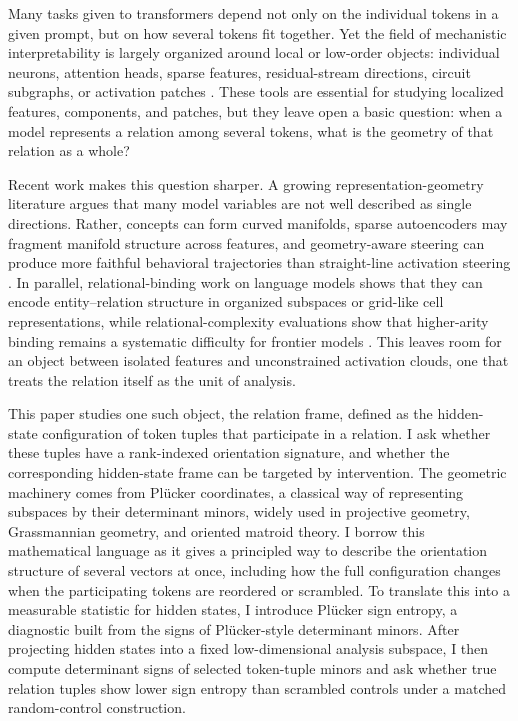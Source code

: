 \documentclass[11pt]{article}
\begin{document}
Many tasks given to transformers depend not only on the individual tokens in a given prompt, but on how several tokens fit together. Yet the field of mechanistic interpretability is largely organized around local or low-order objects: individual neurons, attention heads, sparse features, residual-stream directions, circuit subgraphs, or activation patches \citep{elhage2021framework,bricken2023monosemanticity,cunningham2024sparse,wang2023interpretability,conmy2023acdc}. These tools are essential for studying localized features, components, and patches, but they leave open a basic question: when a model represents a relation among several tokens, what is the geometry of that relation as a whole?

Recent work makes this question sharper. A growing representation-geometry literature argues that many model variables are not well described as single directions. Rather, concepts can form curved manifolds, sparse autoencoders may fragment manifold structure across features, and geometry-aware steering can produce more faithful behavioral trajectories than straight-line activation steering \citep{bhalla2026saemanifolds,wurgaft2026manifoldsteering,sarfati2026beliefs,tiblias2026smds}. In parallel, relational-binding work on language models shows that they can encode entity--relation structure in organized subspaces or grid-like cell representations, while relational-complexity evaluations show that higher-arity binding remains a systematic difficulty for frontier models \citep{dai2026cellbinding,fesser2026rel}. This leaves room for an object between isolated features and unconstrained activation clouds, one that treats the relation itself as the unit of analysis.

This paper studies one such object, the relation frame, defined as the hidden-state configuration of token tuples that participate in a relation. I ask whether these tuples have a rank-indexed orientation signature, and whether the corresponding hidden-state frame can be targeted by intervention. The geometric machinery comes from Pl\"ucker coordinates, a classical way of representing subspaces by their determinant minors, widely used in projective geometry, Grassmannian geometry, and oriented matroid theory. I borrow this mathematical language as it gives a principled way to describe the orientation structure of several vectors at once, including how the full configuration changes when the participating tokens are reordered or scrambled. To translate this into a measurable statistic for hidden states, I introduce Pl\"ucker sign entropy, a diagnostic built from the signs of Pl\"ucker-style determinant minors. After projecting hidden states into a fixed low-dimensional analysis subspace, I then compute determinant signs of selected token-tuple minors and ask whether true relation tuples show lower sign entropy than scrambled controls under a matched random-control construction.
\end{document}
